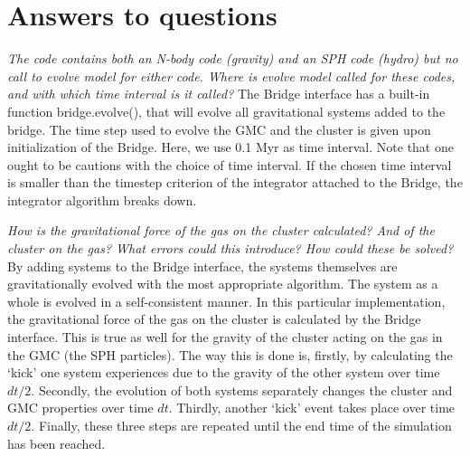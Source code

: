 \documentclass{aa}
\begin{document}
\section{Answers to questions}


\textit{The code contains both an N-body code (gravity) and an SPH code (hydro) but no call to evolve model for either code. Where is evolve model called for these codes, and with which time interval is it called?} The Bridge interface has a built-in function bridge.evolve(), that will evolve all gravitational systems added to the bridge. The time step used to evolve the GMC and the cluster is given upon initialization of the Bridge. Here, we use 0.1 Myr as time interval. Note that one ought to be cautions with the choice of time interval. If the chosen time interval is smaller than the timestep criterion of the integrator attached to the Bridge, the integrator algorithm breaks down.



\textit{How is the gravitational force of the gas on the cluster calculated? And of the cluster on the gas? What errors could this introduce? How could these be solved?}
By adding systems to the Bridge interface, the systems themselves are gravitationally evolved with the most appropriate algorithm. The system as a whole is evolved in a self-consistent manner. In this particular implementation, the gravitational force of the gas on the cluster is calculated by the Bridge interface. This is true as well for the gravity of the cluster acting on the gas in the GMC (the SPH particles). The way this is done is, firstly, by calculating the `kick' one system experiences due to the gravity of the other system over time $dt/2$. Secondly, the evolution of both systems separately changes the cluster and GMC properties over time $dt$. Thirdly, another `kick' event takes place over time $dt/2$. Finally, these three steps are repeated until the end time of the simulation has been reached.
\end{document}
